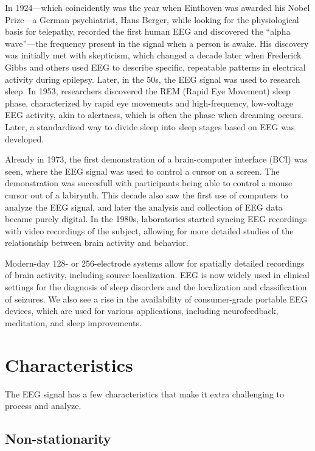 In 1924---which coincidently was the year when Einthoven was awarded his Nobel Prize---a German psychiatrist, Hans Berger, while looking for the physiological basis for telepathy, recorded the first human EEG and discovered the ``alpha wave''—the frequency present in the signal when a person is awake\cite{about_berger}.
His discovery was initially met with skepticism\cite{Mushtaq2024}, which changed a decade later when Frederick Gibbs and others used EEG to describe specific, repeatable patterns in electrical activity during epilepsy\cite{about_gibson}.
Later, in the 50s, the EEG signal was used to research sleep.
In 1953, researchers discovered the REM (Rapid Eye Movement) sleep phase, characterized by rapid eye movements and high-frequency, low-voltage EEG activity, akin to alertness, which is often the phase when dreaming occurs\cite{rem_sleep}.
Later, a standardized way to divide sleep into sleep stages based on EEG was developed\cite{sleep_stage}.

Already in 1973, the first demonstration of a brain-computer interface (BCI) was seen, where the EEG signal was used to control a cursor on a screen\cite{vidal}.
The demonstration was succesfull with participants being able to control a mouse cursor out of a labirynth.
This decade also saw the first use of computers to analyze the EEG signal, and later the analysis and collection of EEG data became purely digital.
In the 1980s, laboratories started syncing EEG recordings with video recordings of the subject, allowing for more detailed studies of the relationship between brain activity and behavior\cite{gloor}.

Modern-day 128- or 256-electrode systems allow for spatially detailed recordings of brain activity, including source localization.
EEG is now widely used in clinical settings for the diagnosis of sleep disorders\cite{sleep_medicine} and the localization and classification of seizures\cite{fisher}.
We also see a rise in the availability of consumer-grade portable EEG devices, which are used for various applications, including neurofeedback, meditation, and sleep improvements.

\section{Characteristics}

The EEG signal has a few characteristics that make it extra challenging to process and analyze.

\subsection{Non-stationarity}

